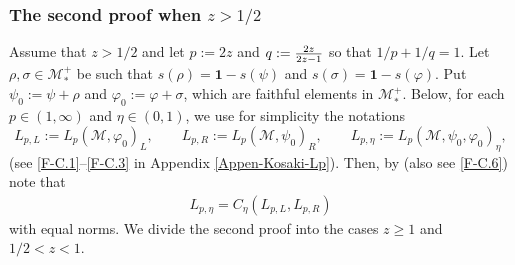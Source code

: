 \documentclass[12pt]{article}
\theoremstyle{definition}
\theoremstyle{remark}
\numberwithin{equation}{section}
\def\Me{\mathcal M}
\def\ffi{\varphi}
\def\1{\mathbf{1}}
\begin{document}
\subsubsection{The second proof when $z>1/2$}\label{Sec-5.1.2}

Assume that $z>1/2$ and let $p:=2z$ and $q:={2z\over2z-1}$ so that $1/p+1/q=1$. Let
$\rho,\sigma\in\Me_*^+$ be such that $s(\rho)=\1-s(\psi)$ and $s(\sigma)=\1-s(\ffi)$. Put
$\psi_0:=\psi+\rho$ and $\ffi_0:=\ffi+\sigma$, which are faithful elements in $\Me_*^+$. Below, for each
$p\in(1,\infty)$ and $\eta\in(0,1)$, we use for simplicity the notations
\[
L_{p,L}:=L_p(\Me,\ffi_0)_L,\qquad L_{p,R}:=L_p(\Me,\psi_0)_R,\qquad
L_{p,\eta}:=L_p(\Me,\psi_0,\ffi_0)_\eta,
\]
(see \eqref{F-C.1}--\eqref{F-C.3} in Appendix \ref{Appen-Kosaki-Lp}). Then, by
\cite[Theorem 11.1]{kosaki1984applications} (also see \eqref{F-C.6}) note that
\begin{align}\label{F-5.7}
L_{p,\eta}=C_\eta(L_{p,L},L_{p,R})
\end{align}
with equal norms. We divide the second proof into the cases $z\ge1$ and $1/2<z<1$.
\end{document}

